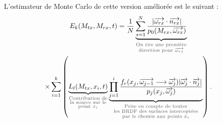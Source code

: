 L'estimateur de Monte Carlo de cette version améliorée est le suivant :
\large \begin{multline}\label{eq:MC_LTE_rendu}
    E_k(M_{tx}, M_{rx}, t) =
    \frac{1}{N}
    \underbrace{
        \sum\limits_{s=1}^N \frac
            {| \overrightarrow{\omega_{rx}} \cdot \overrightarrow{n_{rx}} |}
            {p_0(M_{rx}, \overrightarrow{\omega_{rx}})}
        }
        _{\textcolor{DarkGray}
         {\substack{\text{On tire une première} \\
                    \text{direction pour $\overrightarrow{\omega_{rx}}$}}}}
    \\ \times
    \sum \limits_{i=1}^k
    \left(
        \underbrace
            {L_l(M_{tx}, x_i, t)}
            _{\textcolor{DarkGray}
             {\substack{\text{Contribution de} \\
                        \text{la source sur le} \\
                        \text{point $x_i$}}}}
        \underbrace
            {\prod\limits_{j=1}^i
                \frac
                    {f_r(x_j, \overrightarrow{\omega_{j-1}} \longrightarrow \overrightarrow{\omega_{j}})
                    | \overrightarrow{\omega_j} \cdot \overrightarrow{n_j} |}
                    {p_j(x_j, \overrightarrow{\omega_{j}})}}
                _{\textcolor{DarkGray}
                 {\substack{\text{Prise en compte de toutes} \\
                            \text{les BRDF des surfaces interceptées} \\
                            \text{par le chemin aux points $x_i$}}}}
    \right)
.\end{multline} \normalsize